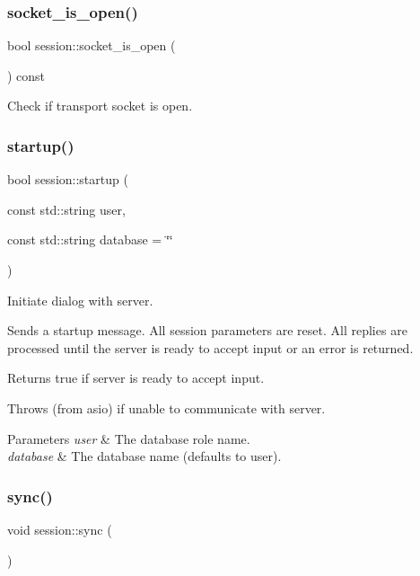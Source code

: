 \subsubsection{\texorpdfstring{socket\+\_\+is\+\_\+open()}{socket\_is\_open()}}
{\footnotesize\ttfamily bool session\+::socket\+\_\+is\+\_\+open (\begin{DoxyParamCaption}{ }\end{DoxyParamCaption}) const\hspace{0.3cm}{\ttfamily [inline]}}



Check if transport socket is open. 

\mbox{\label{classsession_a251ef96690813b1ef4e3632082ce5fc3}} 
\subsubsection{\texorpdfstring{startup()}{startup()}}
{\footnotesize\ttfamily bool session\+::startup (\begin{DoxyParamCaption}\item[{const std\+::string}]{user,  }\item[{const std\+::string}]{database = {\ttfamily \char`\"{}\char`\"{}} }\end{DoxyParamCaption})\hspace{0.3cm}{\ttfamily [inline]}}



Initiate dialog with server. 

Sends a startup message. All session parameters are reset. All replies are processed until the server is ready to accept input or an error is returned.

Returns true if server is ready to accept input.

Throws (from asio) if unable to communicate with server. 
\begin{DoxyParams}{Parameters}
{\em user} & The database role name. \\
\hline
{\em database} & The database name (defaults to user). \\
\hline
\end{DoxyParams}
\mbox{\label{classsession_a7110489d3bbf811651e1462b7c63ba6f}} 
\subsubsection{\texorpdfstring{sync()}{sync()}}
{\footnotesize\ttfamily void session\+::sync (\begin{DoxyParamCaption}{ }\end{DoxyParamCaption})\hspace{0.3cm}{\ttfamily [inline]}}



